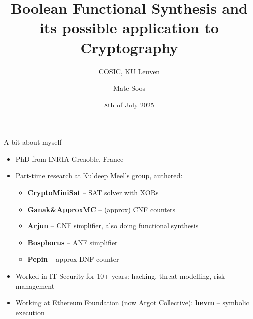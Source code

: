 \documentclass[aspectratio=169]{beamer}
\title[Func. Synthesis]{
Boolean Functional Synthesis and its possible application to Cryptography}
\author[Soos]{Mate Soos}
\institute[Argot]{\large Argot Collective (\url{https://argot.org})}
\date{8th of July 2025}
\subtitle{COSIC, KU Leuven}
\begin{document}
\begin{frame}
    \titlepage
\end{frame}

\begin{frame}{A bit about myself}
\begin{itemize}
\item PhD from INRIA Grenoble, France
\item Part-time research at Kuldeep Meel's group, authored:
    \begin{itemize}
        \item \textbf{CryptoMiniSat} -- SAT solver with XORs
        \item \textbf{Ganak\&ApproxMC} -- (approx) CNF counters
        \item \textbf{Arjun} -- CNF simplifier, also doing functional synthesis
        \item \textbf{Bosphorus} -- ANF simplifier
        \item \textbf{Pepin} -- approx DNF counter
    \end{itemize}
\item Worked in IT Security for 10+ years: hacking,
    threat modelling, risk management
\item Working at Ethereum Foundation (now Argot Collective):
    \textbf{hevm} -- symbolic execution
\end{itemize}
\end{frame}

\end{document}
